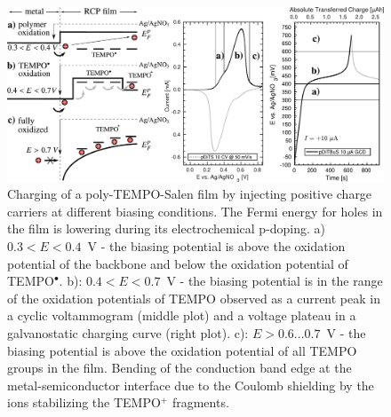 \begin{figure}[!ht]
\center
	\includegraphics[width=1\textwidth]{./electrochemistry/figures/transport_in_film.pdf}
	\caption{Charging of a poly-TEMPO-Salen film by injecting positive charge carriers at different biasing conditions. The Fermi energy for holes in the film is lowering during its electrochemical p-doping. a) $0.3<E<0.4$~V - the biasing potential is above the oxidation potential of the backbone and below the oxidation potential of TEMPO$^{\bullet}$. b): $0.4<E<0.7$~V - the biasing potential is in the range of the oxidation potentials of TEMPO observed as a current peak in a cyclic voltammogram (middle plot) and a voltage plateau in a galvanostatic charging curve (right plot). c): $E>0.6...0.7$~V - the biasing potential is above the oxidation potential of all TEMPO groups in the film. Bending of the conduction band edge at the metal-semiconductor interface due to the Coulomb shielding by the ions stabilizing the TEMPO$^+$ fragments.}
	\label{fig:biasing_charging}
\end{figure}

